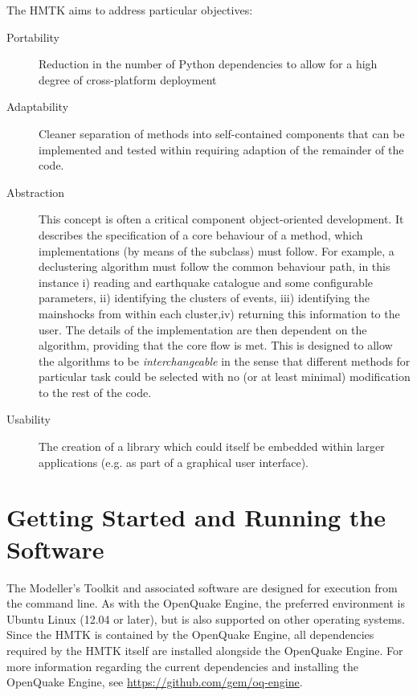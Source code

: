 The HMTK aims to address particular objectives:

\begin{description}
\item[Portability] Reduction in the number of Python dependencies to allow for a high degree of cross-platform deployment 

\item[Adaptability] Cleaner separation of methods into self-contained components that can be implemented and tested within requiring adaption of the remainder of the code.

\item[Abstraction] This concept is often a critical component object-oriented development. It describes the specification of a core behaviour of a method, which implementations (by means of the subclass) must follow. For example, a declustering algorithm must follow the common behaviour path, in this instance i) reading and earthquake catalogue and some configurable parameters, ii) identifying the clusters of events, iii) identifying the mainshocks from within each cluster,iv) returning this information to the user. The details of the implementation are then dependent on the algorithm, providing that the core flow is met. This is designed to allow the algorithms to be \emph{interchangeable} in the sense that different methods for  particular task could be selected with no (or at least minimal) modification to the rest of the code.

\item[Usability] The creation of a library which could itself be embedded within larger applications (e.g. as part of a graphical user interface).
 
\end{description}



\section{Getting Started and Running the Software}

The Modeller's Toolkit and associated software are designed for execution 
from the command line. As with the OpenQuake Engine, the preferred environment is 
Ubuntu Linux (12.04 or later), but is also supported on other operating systems.
Since the HMTK is contained by the OpenQuake Engine, all dependencies required by the HMTK itself are installed alongside the OpenQuake Engine. For more information regarding the current dependencies and installing the OpenQuake Engine, see \href{https://github.com/gem/oq-engine}{https://github.com/gem/oq-engine}.


